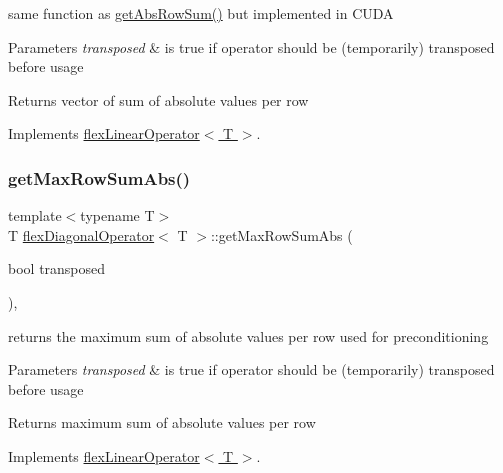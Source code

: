 same function as \hyperlink{classflex_diagonal_operator_ad53cb526b55141a1d0519a023572cf58}{get\+Abs\+Row\+Sum()} but implemented in C\+U\+DA 


\begin{DoxyParams}{Parameters}
{\em transposed} & is true if operator should be (temporarily) transposed before usage \\
\hline
\end{DoxyParams}
\begin{DoxyReturn}{Returns}
vector of sum of absolute values per row 
\end{DoxyReturn}


Implements \hyperlink{classflex_linear_operator_a0a0a431d43f4f9d36cbee0d31ba5a29b}{flex\+Linear\+Operator$<$ T $>$}.

\mbox{\label{classflex_diagonal_operator_aa9c144ae23fbcbcdcd14cc779182896a}} 
\subsubsection{\texorpdfstring{get\+Max\+Row\+Sum\+Abs()}{getMaxRowSumAbs()}}
{\footnotesize\ttfamily template$<$typename T$>$ \\
T \hyperlink{classflex_diagonal_operator}{flex\+Diagonal\+Operator}$<$ T $>$\+::get\+Max\+Row\+Sum\+Abs (\begin{DoxyParamCaption}\item[{bool}]{transposed }\end{DoxyParamCaption})\hspace{0.3cm}{\ttfamily [inline]}, {\ttfamily [virtual]}}



returns the maximum sum of absolute values per row used for preconditioning 


\begin{DoxyParams}{Parameters}
{\em transposed} & is true if operator should be (temporarily) transposed before usage \\
\hline
\end{DoxyParams}
\begin{DoxyReturn}{Returns}
maximum sum of absolute values per row 
\end{DoxyReturn}


Implements \hyperlink{classflex_linear_operator_afcb74697385ccb7c8d29870d7034c12a}{flex\+Linear\+Operator$<$ T $>$}.

